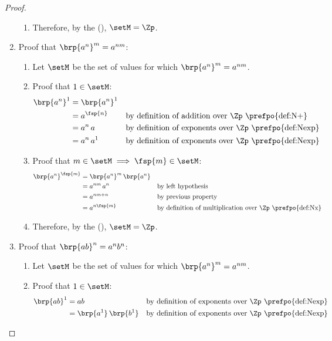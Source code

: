 \begin{proof}
\begin{enumerate}
\begin{enumerate}
      \item Therefore, by the  (),
            $\setM=\Zp$.
    \end{enumerate}


  \item Proof that $\brp{a^n}^m = a^{nm}$:
    \begin{enumerate}
      \item Let $\setM$ be the set of values for which $\brp{a^n}^m = a^{nm}$.
      \item Proof that $1\in\setM$:
        \begin{align*}
          \brp{a^n}^1
            &= \brp{a^n}^1
          \\&= a^{\fsp{n}}
            && \text{by definition of addition over $\Zp$ \prefpo{def:N+}}
          \\&= a^n\, a
            && \text{by definition of exponents over $\Zp$ \prefpo{def:Nexp}}
          \\&= a^n\, a^1
            && \text{by definition of exponents over $\Zp$ \prefpo{def:Nexp}}
        \end{align*}

      \item Proof that $m\in\setM\implies\fsp{m}\in\setM$:
        \begin{align*}
          \brp{a^n}^\fsp{m}
            &= \brp{a^n}^m \, \brp{a^n}
          \\&= a^{nm} \, a^n
            && \text{by left hypothesis}
          \\&= a^{nm+n}
            && \text{by previous property}
          \\&= a^{n\fsp{m}}
            && \text{by definition of multiplication over $\Zp$ \prefpo{def:Nx}}
        \end{align*}

      \item Therefore, by the  (),
            $\setM=\Zp$.
    \end{enumerate}


  \item Proof that $\brp{ab}^n = a^n b^n$:
    \begin{enumerate}
      \item Let $\setM$ be the set of values for which $\brp{a^n}^m = a^{nm}$.
      \item Proof that $1\in\setM$:
        \begin{align*}
          \brp{ab}^1
            &= ab
            && \text{by definition of exponents over $\Zp$ \prefpo{def:Nexp}}
          \\&= \brp{a^1}\, \brp{b^1}
            && \text{by definition of exponents over $\Zp$ \prefpo{def:Nexp}}
        \end{align*}


\end{enumerate}
\end{enumerate}
\end{proof}

